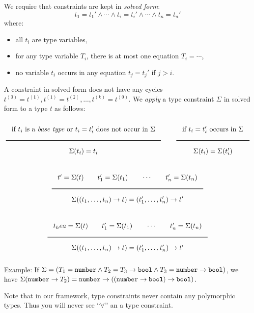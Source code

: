 \noindent
We require that constraints are kept in \emph{solved form}:
\[
t_1 = t_1' \wedge \cdots \wedge t_i = t_i' \wedge \cdots \wedge t_n = t_n'
\]
where:
\begin{itemize}
\item all $t_i$ are type variables,
\item for any type variable $T_i$, there is at most one equation $T_i = \cdots$,
\item no variable $t_i$ occurs in any equation $t_j = t_j'$ if $j > i$.
\end{itemize}
A constraint in solved form does not have any cycles $t^{(0)} = t^{(1)}, t^{(1)} = t^{(2)}, \ldots, t^{(k)} = t^{(0)}$.
We \emph{apply} a type constraint $\Sigma$ in solved form to a type $t$ as follows:

\[
  \Rule{\textrm{if $t_i$ is a \emph{base type} or }t_i = t_i'\textrm{ does not occur in }\Sigma}{
    \Sigma(t_i) = t_i}
  \qquad
  \Rule{\textrm{if }t_i = t_i'\textrm{ occurs in }\Sigma}{
    \Sigma(t_i) = \Sigma(t_i')}  
\]

\[
  \Rule{t' = \Sigma(t) \qquad t_1' = \Sigma(t_1) \qquad \cdots \qquad t_n' = \Sigma(t_n) }{
  \Sigma((t_1, \ldots, t_n) \rightarrow t) = (t_1', \ldots, t_n') \rightarrow t'}
\]

\[
  \Rule{t_hea = \Sigma(t) \qquad t_1' = \Sigma(t_1) \qquad \cdots \qquad t_n' = \Sigma(t_n) }{
  \Sigma((t_1, \ldots, t_n) \rightarrow t) = (t_1', \ldots, t_n') \rightarrow t'}
\]

\noindent
Example: If $\Sigma = (T_1 = \texttt{number} \wedge T_2 = T_3 \rightarrow \texttt{bool} \wedge T_3 = \texttt{number}
\rightarrow \texttt{bool})$, we have $\Sigma(\texttt{number} \rightarrow T_2) = \texttt{number} \rightarrow ((\texttt{number}
\rightarrow \texttt{bool}) \rightarrow \texttt{bool})$.

Note that in our framework, type constraints never contain any polymorphic types. Thus
you will never see ``$\forall$'' an a type constraint.

